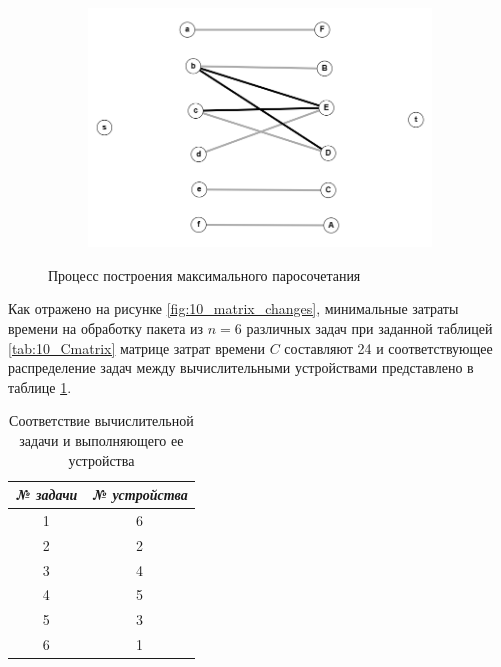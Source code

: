 \documentclass{article}
\begin{document}
\begin{enumerate}
\begin{figure}
\begin{subfigure}[t]{0.32\textwidth}
         \includegraphics[width=\textwidth]{attachments/10/7_.png}
         \label{fig:10_7}
     \end{subfigure}
    \caption{Процесс построения максимального паросочетания}
    \label{fig:10_max_pairs}
\end{figure}
Как отражено на рисунке \ref{fig:10_matrix_changes}, минимальные затраты времени на обработку пакета из $n = 6$ различных задач при заданной таблицей \ref{tab:10_Cmatrix} матрице затрат времени $C$ составляют 24 и соответствующее распределение задач между вычислительными устройствами представлено в таблице \ref{tab:10_res}.
\begin{table}
    \centering
    \begin{tabular}{c|c}
        \textit{№ задачи} & \textit{№ устройства} \\ \hline
        1 & 6 \\
        2 & 2 \\
        3 & 4 \\
        4 & 5 \\
        5 & 3 \\
        6 & 1 \\ \hline
    \end{tabular}
    \caption{Соответствие вычислительной задачи и выполняющего ее устройства}
    \label{tab:10_res}
\end{table}
\end{enumerate}
\end{document}
